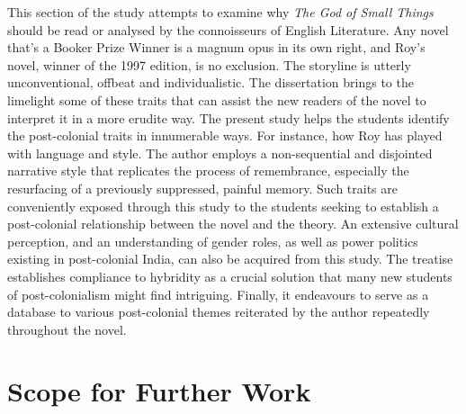 This section of the study attempts to examine why \emph{The God of Small Things} should be read or analysed by the connoisseurs of English Literature. Any novel that's a Booker Prize Winner is a magnum opus in its own right, and Roy's novel, winner of the 1997 edition, is no exclusion. The storyline is utterly unconventional, offbeat and individualistic. The dissertation brings to the limelight some of these traits that can assist the new readers of the novel to interpret it in a more erudite way. The present study helps the students identify the post-colonial traits in innumerable ways. For instance, how Roy has played with language and style. The author employs a non-sequential and disjointed narrative style that replicates the process of remembrance, especially the resurfacing of a previously suppressed, painful memory. Such traits are conveniently exposed through this study to the students seeking to establish a post-colonial relationship between the novel and the theory. An extensive cultural perception, and an understanding of gender roles, as well as power politics existing in post-colonial India,  can also be acquired from this study. The treatise establishes compliance to hybridity as a crucial solution that many new students of post-colonialism might find intriguing. Finally, it endeavours to serve as a database to various post-colonial themes reiterated by the author repeatedly throughout the novel.

\section{Scope for Further Work}

